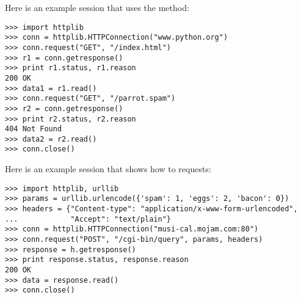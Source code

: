 Here is an example session that uses the  method:

\begin{verbatim}
>>> import httplib
>>> conn = httplib.HTTPConnection("www.python.org")
>>> conn.request("GET", "/index.html")
>>> r1 = conn.getresponse()
>>> print r1.status, r1.reason
200 OK
>>> data1 = r1.read()
>>> conn.request("GET", "/parrot.spam")
>>> r2 = conn.getresponse()
>>> print r2.status, r2.reason
404 Not Found
>>> data2 = r2.read()
>>> conn.close()
\end{verbatim}

Here is an example session that shows how to  requests:

\begin{verbatim}
>>> import httplib, urllib
>>> params = urllib.urlencode({'spam': 1, 'eggs': 2, 'bacon': 0})
>>> headers = {"Content-type": "application/x-www-form-urlencoded",
...            "Accept": "text/plain"}
>>> conn = httplib.HTTPConnection("musi-cal.mojam.com:80")
>>> conn.request("POST", "/cgi-bin/query", params, headers)
>>> response = h.getresponse()
>>> print response.status, response.reason
200 OK
>>> data = response.read()
>>> conn.close()
\end{verbatim}
